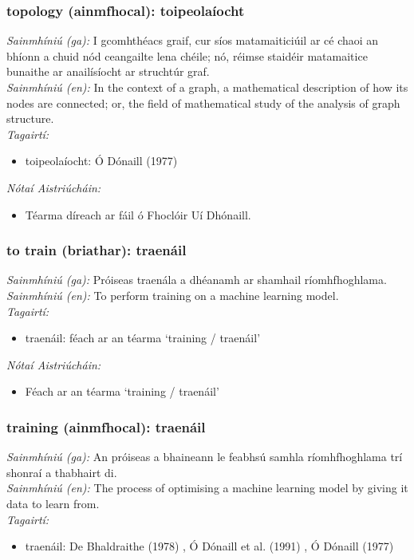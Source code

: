 \subsubsection*{topology (ainmfhocal): toipeolaíocht}
 \noindent \textit{Sainmhíniú (ga):} I gcomhthéacs graif, cur síos matamaiticiúil ar cé chaoi an bhíonn a chuid nód ceangailte lena chéile; nó, réimse staidéir matamaitice bunaithe ar anailísíocht ar struchtúr graf.
\\
 \noindent \textit{Sainmhíniú (en):} In the context of a graph, a mathematical description of how its nodes are connected; or, the field of mathematical study of the analysis of graph structure.
\\
 \noindent \textit{Tagairtí:}
\begin{itemize}
	\item toipeolaíocht: Ó Dónaill (1977) \cite{odonaill}
\end{itemize}

 \noindent \textit{Nótaí Aistriúcháin:}
\begin{itemize}
	\item Téarma díreach ar fáil ó Fhoclóir Uí Dhónaill.
\end{itemize}


\subsubsection*{to train (briathar): traenáil}
 \noindent \textit{Sainmhíniú (ga):} Próiseas traenála a dhéanamh ar shamhail ríomhfhoghlama.
\\
 \noindent \textit{Sainmhíniú (en):} To perform training on a machine learning model.
\\
 \noindent \textit{Tagairtí:}
\begin{itemize}
	\item traenáil: féach ar an téarma `training / traenáil'
\end{itemize}

 \noindent \textit{Nótaí Aistriúcháin:}
\begin{itemize}
	\item Féach ar an téarma `training / traenáil'
\end{itemize}


\subsubsection*{training (ainmfhocal): traenáil}
 \noindent \textit{Sainmhíniú (ga):} An próiseas a bhaineann le feabhsú samhla ríomhfhoghlama trí shonraí a thabhairt di.
\\
 \noindent \textit{Sainmhíniú (en):} The process of optimising a machine learning model by giving it data to learn from.
\\
 \noindent \textit{Tagairtí:}
\begin{itemize}
	\item traenáil: De Bhaldraithe (1978) \cite{de-bhaldraithe}, Ó Dónaill et al. (1991) \cite{focloir-beag}, Ó Dónaill (1977) \cite{odonaill}
\end{itemize}

